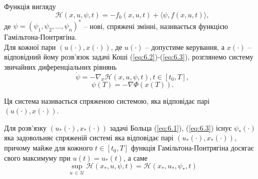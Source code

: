 Функція вигляду
\begin{equation}
    \label{eq:6.4}
    \mathcal{H}(x, u, \psi, t) = - f_0(x, u, t) + \langle \psi, f(x, u, t) \rangle,
\end{equation}
де $\psi = (\psi_1, \psi_2, \ldots, \psi_n)^*$ -- нові, спряжені змінні, називається функцією Гамільтона-Понтрягіна. \\

Для кожної пари $(u(\cdot), x(\cdot))$, де $u(\cdot)$ -- допустиме керування, а $x(\cdot)$ -- відповідний йому розв'язок задачі Коші (\ref{eq:6.2})-(\ref{eq:6.3}), розглянемо систему звичайних диференціальних рівнянь
\begin{equation}
    \label{eq:6.5}
    \dot \psi = - \nabla_x \mathcal{H}(x, u, \psi, t), t \in [t_0, T],
\end{equation}
\begin{equation}
    \label{eq:6.6}
    \psi(T) = - \nabla \Phi(x(T)).
\end{equation}

Ця система називається спряженою системою, яка відповідає парі $(u(\cdot), x(\cdot))$. \\

\begin{theorem}
    Для розв'язку $(u_*(\cdot), x_*(\cdot))$ задачі Больца (\ref{eq:6.1}), (\ref{eq:6.3}) існує $\psi_*(\cdot)$ яка задовольняє спряженій системі яка відповідає парі $(u_*(\cdot), x_*(\cdot))$, причому майже для кожного $t \in [t_0, T]$ функція Гамільтона-Понтрягіна досягає свого максимуму при $u(t) = u_*(t)$, а саме
    \begin{equation*}
        \sup_{u \, \in \, \mathcal{U}} \mathcal{H}(x_*, u, \psi, t) = \mathcal{H}(x_*, u_*, \psi_*, t)
    \end{equation*}
\end{theorem}


